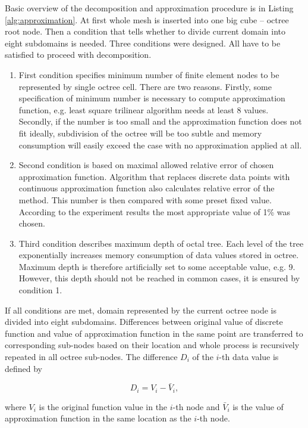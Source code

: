 Basic overview of the decomposition and approximation procedure is in Listing \ref{alg:approximation}. At first whole mesh is inserted into one big cube -- octree root node. Then a condition that tells whether to divide current domain into eight subdomains is needed. Three conditions were designed. All have to be satisfied to proceed with decomposition.

\begin{enumerate}
    \item First condition specifies minimum number of finite element nodes to be represented by single octree cell. There are two reasons. Firstly, some specification of minimum number is necessary to compute approximation function, e.g. least square trilinear algorithm needs at least 8 values. Secondly, if the number is too small and the approximation function does not fit ideally, subdivision of the octree will be too subtle and memory consumption will easily exceed the case with no approximation applied at all.
    \item Second condition is based on maximal allowed relative error of chosen approximation function. Algorithm that replaces discrete data points with continuous approximation function also calculates relative error of the method. This number is then compared with some preset fixed value. According to the experiment results the most appropriate value of 1\% was chosen.
    \item Third condition describes maximum depth of octal tree. Each level of the tree exponentially increases memory consumption of data values stored in octree. Maximum depth is therefore artificially set to some acceptable value, e.g. 9. However, this depth should not be reached in common cases, it is ensured by condition 1.
\end{enumerate}

If all conditions are met, domain represented by the current octree node is divided into eight subdomains. Differences between original value of discrete function and value of approximation function in the same point are transferred to corresponding sub-nodes based on their location and whole process is recursively repeated in all octree sub-nodes. The difference $D_i$ of the $i$-th data value is defined by

\begin{equation}
D_i=V_i-\bar{V}_i, %
\end{equation}

where $V_i$ is the original function value in the $i$-th node and $\bar{V}_i$ is the value of approximation function in the same location as the $i$-th node.

